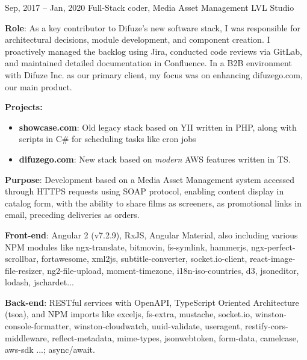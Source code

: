 \documentclass[
  a4paper,
   maincolor=cvblue,
   sectioncolor=cvblue,
   sidebarwidth=0.323\paperwidth,
]{fortysecondscv}
\begin{document}
\begin{cvtableNew}
  \cvitemRightNew
    {Sep, 2017 – Jan, 2020} %
    {Full-Stack coder, Media Asset Management} %
    {LVL Studio} %
      {
        \vspace{0.1pt} %
        \textbf{Role}: As a key contributor to Difuze’s new software stack, I was responsible for architectural decisions, module development, and component creation. I proactively managed the backlog using Jira, conducted code reviews via GitLab, and maintained detailed documentation in Confluence. In a B2B environment with Difuze Inc. as our primary client, my focus was on enhancing difuzego.com, our main product.\vspace{5pt}

        \vspace{0.1pt} %
        \textbf{Projects:}
        \begin{itemize}[itemsep=1mm, topsep=5pt, leftmargin=8pt]
          \item \textbf{showcase.com}: Old legacy stack based on YII written in PHP, along with scripts in C\# for scheduling tasks like cron jobs
          \item \textbf{difuzego.com}: New stack based on \textit{modern} AWS features written in TS.
        \end{itemize}

        \vspace{4pt} %
        \textbf{Purpose}: Development based on a Media Asset Management system accessed through HTTPS requests using SOAP protocol, enabling content display in catalog form, with the ability to share films as screeners, as promotional links in email, preceding deliveries as orders.\vspace{5pt}

        \textbf{Front-end}: Angular 2 (v7.2.9), RxJS, Angular Material, also including various NPM modules like ngx-translate, bitmovin, fs-symlink, hammerjs, ngx-perfect-scrollbar, fortawesome, xml2js, subtitle-converter, socket.io-client, react-image-file-resizer, ng2-file-upload, moment-timezone, i18n-iso-countries, d3, jsoneditor, lodash, jschardet...\vspace{5pt}

        \textbf{Back-end}: RESTful services with OpenAPI, TypeScript Oriented Architecture (tsoa), and NPM imports like exceljs, fs-extra, mustache, socket.io, winston-console-formatter, winston-cloudwatch, uuid-validate, useragent, restify-cors-middleware, reflect-metadata, mime-types, jsonwebtoken, form-data, camelcase, aws-sdk ...; async/await.\vspace{5pt}

}
\end{cvtableNew}
\end{document}
